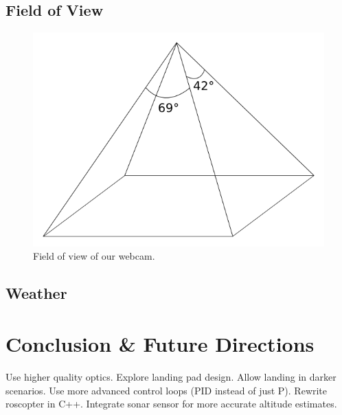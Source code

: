 \documentclass[10pt]{scrartcl} %
\begin{document}
\subsection{Field of View}



\begin{figure}[h]
    \centering
    \includegraphics{images/fov.png}
    \caption{Field of view of our webcam.}
    \label{fig:fov}
\end{figure}

\subsection{Weather}


\section{Conclusion \& Future Directions}

Use higher quality optics.
Explore landing pad design.
Allow landing in darker scenarios.
Use more advanced control loops (PID instead of just P).
Rewrite roscopter in C++.
Integrate sonar sensor for more accurate altitude estimates.

\printbibliography
\end{document}
